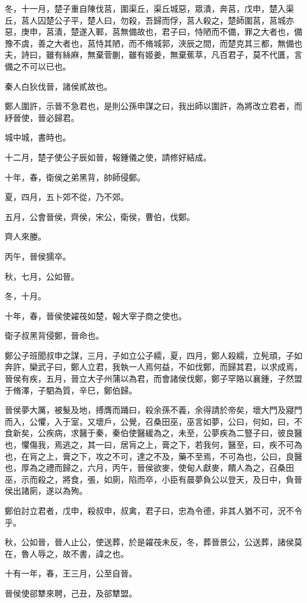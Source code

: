 \begin{pinyinscope}
冬，十一月，楚子重自陳伐莒，圍渠丘，渠丘城惡，眾潰，奔莒，戊申，楚入渠丘，莒人囚楚公子平，楚人曰，勿殺，吾歸而俘，莒人殺之，楚師圍莒，莒城亦惡，庚申，莒潰，楚遂入鄆，莒無備故也，君子曰，恃陋而不備，罪之大者也，備豫不虞，善之大者也，莒恃其陋，而不脩城郭，浹辰之間，而楚克其三都，無備也夫，詩曰，雖有絲麻，無棄菅蒯，雖有姬姜，無棄蕉萃，凡百君子，莫不代匱，言備之不可以已也。

秦人白狄伐晉，諸侯貳故也。

鄭人圍許，示晉不急君也，是則公孫申謀之曰，我出師以圍許，為將改立君者，而紓晉使，晉必歸君。

城中城，書時也。

十二月，楚子使公子辰如晉，報鍾儀之使，請修好結成。

十年，春，衛侯之弟黑背，帥師侵鄭。

夏，四月，五卜郊不從，乃不郊。

五月，公會晉侯，齊侯，宋公，衛侯，曹伯，伐鄭。

齊人來媵。

丙午，晉侯獳卒。

秋，七月，公如晉。

冬，十月。

十年，春，晉侯使糴茷如楚，報大宰子商之使也。

衛子叔黑背侵鄭，晉命也。

鄭公子班聞叔申之謀，三月，子如立公子繻，夏，四月，鄭人殺繻，立髡頑，子如奔許，欒武子曰，鄭人立君，我執一人焉何益，不如伐鄭，而歸其君，以求成焉，晉侯有疾，五月，晉立大子州蒲以為君，而會諸侯伐鄭，鄭子罕賂以襄鍾，子然盟于脩澤，子駟為質，辛巳，鄭伯歸。

晉侯夢大厲，被髮及地，搏膺而踊曰，殺余孫不義，余得請於帝矣，壞大門及寢門而入，公懼，入于室，又壞戶，公覺，召桑田巫，巫言如夢，公曰，何如，曰，不食新矣，公疾病，求醫于秦，秦伯使醫緩為之，未至，公夢疾為二豎子曰，彼良醫也，懼傷我，焉逃之，其一曰，居肓之上，膏之下，若我何，醫至，曰，疾不可為也，在肓之上，膏之下，攻之不可，達之不及，藥不至焉，不可為也，公曰，良醫也，厚為之禮而歸之，六月，丙午，晉侯欲麥，使甸人獻麥，饋人為之，召桑田巫，示而殺之，將食，張，如廁，陷而卒，小臣有晨夢負公以登天，及日中，負晉侯出諸廁，遂以為殉。

鄭伯討立君者，戊申，殺叔申，叔禽，君子曰，忠為令德，非其人猶不可，況不令乎。

秋，公如晉，晉人止公，使送葬，於是糴茷未反，冬，葬晉景公，公送葬，諸侯莫在，魯人辱之，故不書，諱之也。

十有一年，春，王三月，公至自晉。

晉侯使郤犨來聘，己丑，及郤犨盟。


\end{pinyinscope}
